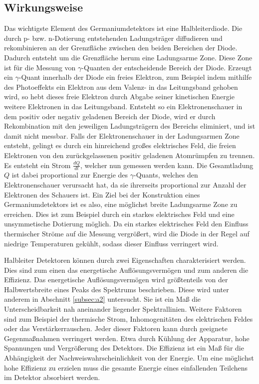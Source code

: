 \subsection{Wirkungsweise}
\label{subsec:Wirkungsweise}
Das wichtigste Element des Germaniumdetektors ist eine Halbleiterdiode.
Die durch p- bzw. n-Dotierung entstehenden Ladungsträger diffudieren und rekombinieren an der Grenzfläche zwischen den beiden Bereichen der Diode.
Dadurch entsteht um die Grenzfläche herum eine Ladungsarme Zone.
Diese Zone ist für die Messung von $\gamma$-Quanten der entscheidende Bereich der Diode.
Erzeugt ein $\gamma$-Quant innerhalb der Diode ein freies Elektron, zum Beispiel indem mithilfe des Photoeffekts ein Elektron aus dem Valenz- in das Leitungsband gehoben wird, so hebt dieses freie Elektron durch Abgabe seiner kinetischen Energie weitere Elektronen in das Leitungsband.
Entsteht so ein Elektronenschauer in dem positiv oder negativ geladenen Bereich der Diode, wird er durch Rekombination mit den jeweiligen Ladungsträgern des Bereichs eliminiert, und ist damit nicht messbar.
Falls der Elektronenschauer in der Ladungsarmen Zone entsteht, gelingt es durch ein hinreichend großes elektrisches Feld, die freien Elektronen von den zurückgelassenen positiv geladenen Atomrümpfen zu trennen.
Es entsteht ein Strom $\frac{dQ}{dt}$, welcher nun gemessen werden kann.
Die Gesamtladung $Q$ ist dabei proportional zur Energie des $\gamma$-Quants, welches den Elektronenschauer verursacht hat, da sie ihrerseits proportional zur Anzahl der Elektronen des Schauers ist.
Ein Ziel bei der Konstruktion eines Germaniumdetektors ist es also, eine möglichst breite Ladungsarme Zone zu erreichen.
Dies ist zum Beispiel durch ein starkes elektrisches Feld und eine unsymmetische Dotierung möglich.
Da ein starkes elektrisches Feld den Einfluss thermischer Ströme auf die Messung vergrößert, wird die Diode in der Regel auf niedrige Temperaturen gekühlt, sodass dieser Einfluss verringert wird.

Halbleiter Detektoren können durch zwei Eigenschaften charakterisiert werden.
Dies sind zum einen das energetische Auflösungsvermögen und zum anderen die Effizienz.
Das energetische Auflösungsvermögen wird größtenteils von der Halbwertsbreite eines Peaks des Spektrums beschrieben.
Diese wird unter anderem in Abschnitt \ref{subsec:a2} untersucht.
Sie ist ein Maß die Unterscheidbarkeit nah aneinander liegender Spektrallinien.
Weitere Faktoren sind zum Beispiel der thermische Strom, Inhomogenitäten des elektrischen Feldes oder das Verstärkerrauschen.
Jeder dieser Faktoren kann durch geeignete Gegenmaßnahmen verringert werden.
Etwa durch Kühlung der Apparatur, hohe Spannungen und Vergrößerung des Detektors.
Die Effizienz ist ein Maß für die Abhängigkeit der Nachweiswahrscheinlichkeit von der Energie.
Um eine möglichst hohe Effizienz zu erzielen muss die gesamte Energie eines einfallenden Teilchens im Detektor absorbiert werden.

